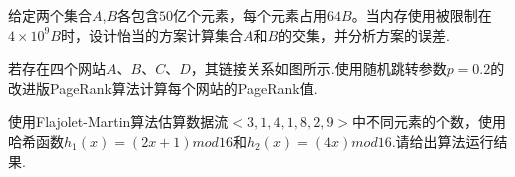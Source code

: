 \documentclass[list, windows]{BHCexam}
\begin{document}
\begin{groups}
\begin{questions}[p]
\begin{solution}{4cm}
\end{solution}
\end{questions}

\begin{questions}[p]
\begin{minipage}{\linewidth}
\question [12] 给定两个集合$A$,$B$各包含$50$亿个元素，每个元素占用$64B$。当内存使用被限制在$4\times10^9B$时，设计怡当的方案计算集合$A$和$B$的交集，并分析方案的误差.
\end{minipage}
\begin{solution}{4cm}

\end{solution}
\end{questions}


\begin{questions}[p]
\begin{minipage}{\linewidth}
\question [10] 若存在四个网站$A$、$B$、$C$、$D$，其链接关系如图所示.使用随机跳转参数$p=0.2$的改进版PageRank算法计算每个网站的PageRank值.
\end{minipage}
\begin{solution}{4cm}

\end{solution}
\end{questions}


\begin{questions}[p]
\begin{minipage}{\linewidth}
\question [10] 使用Flajolet-Martin算法估算数据流$<3,1,4,1,8,2,9>$中不同元素的个数，使用哈希函数$h_{1}(x) = (2x+1)mod 16$和$h_{2}(x)=(4x) mod 16$.请给出算法运行结果.
\end{minipage}
\begin{solution}{4cm}

\end{solution}
\end{questions}

\end{groups}
\label{lastpage}
\end{document}
